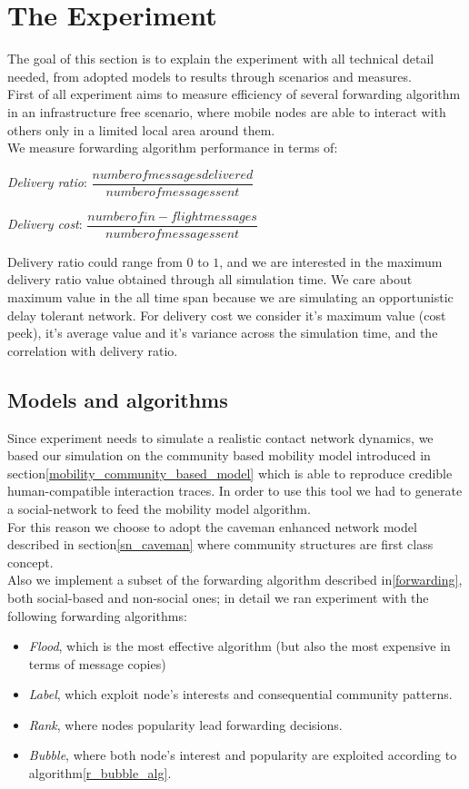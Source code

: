 \section{The Experiment}
\label{experiment}

The goal of this section is to explain the experiment with all technical detail needed, from adopted models to results through scenarios and measures.\\
First of all experiment aims to measure efficiency of several forwarding algorithm in an infrastructure free scenario, where mobile nodes are able to interact with others only in a limited local area around them. \\
We measure forwarding algorithm performance in terms of:
\begin{list}{}
\item \emph{Delivery ratio}: $ \dfrac{number of messages delivered}{ number of messages sent } $ 
\item \emph{Delivery cost}:  $ \dfrac{number of in-flight messages }{ number of messages sent } $
\end{list}
Delivery ratio could range from $0$ to $1$, and we are interested in the maximum delivery ratio value obtained through all simulation time. We care about maximum value in the all time span because we are simulating an opportunistic delay tolerant network. For delivery cost we consider it's maximum value (cost peek), it's average value and it's variance across the simulation time, and the correlation with delivery ratio.\\ 

\subsection{Models and algorithms}
\label{exp_incarnation}
Since experiment needs to simulate a realistic contact network dynamics, we based our simulation on the community based mobility model introduced in section\ref{mobility_community_based_model} which is able to reproduce credible human-compatible interaction traces. In order to use this tool we had to generate a social-network to feed the mobility model algorithm.\\
For this reason we choose to adopt the caveman enhanced network model described in section\ref{sn_caveman} where community structures are first class concept.\\
Also we implement a subset of the forwarding algorithm described in\ref{forwarding}, both social-based and non-social ones; in detail we ran experiment with the following forwarding algorithms:
\begin{itemize}
\item \emph{Flood}, which is the most effective algorithm (but also the most expensive in terms of message copies)
\item \emph{Label}, which exploit node's interests and consequential community patterns.
\item \emph{Rank}, where nodes popularity lead forwarding decisions.
\item \emph{Bubble}, where both node's interest and popularity are exploited according to algorithm\ref{r_bubble_alg}.
\end{itemize}

